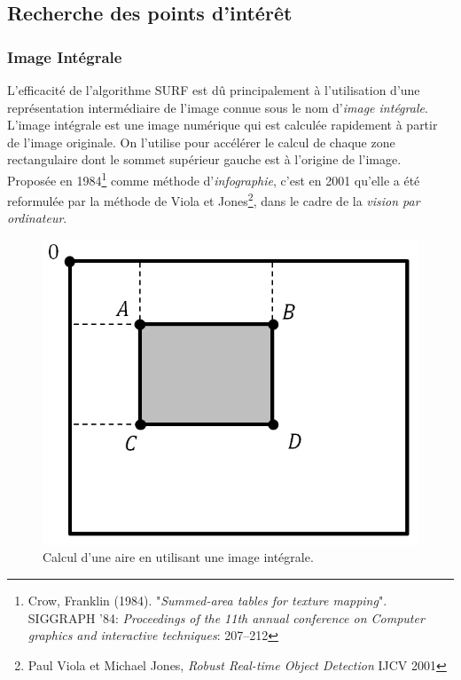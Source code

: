 \documentclass[a4paper,11pt]{report}
\begin{document}
\subsection{Recherche des points d'intérêt}
\subsubsection{Image Intégrale}
L'efficacité de l'algorithme SURF est dû principalement à l'utilisation d'une représentation intermédiaire de l'image connue sous le nom d'\textit{image intégrale}.
\\L'image intégrale est une image numérique qui est calculée rapidement à partir de l'image originale. On l'utilise pour accélérer le calcul de chaque zone rectangulaire dont le sommet supérieur gauche est à l'origine de l'image. 
\\Proposée en 1984\footnote{Crow, Franklin (1984). "\textit{Summed-area tables for texture mapping}". SIGGRAPH '84: \textit{Proceedings of the 11th annual conference on Computer graphics and interactive techniques}: 207–212} comme méthode d'\textit{infographie}, c'est en 2001 qu'elle a été reformulée par la méthode de Viola et Jones\footnote{Paul Viola et Michael Jones, \textit{Robust Real-time Object Detection} IJCV 2001}, dans le cadre de la \textit{vision par ordinateur}.
\begin{figure}[ht]
\centering
\includegraphics[scale=0.3]{figure1.png}
\caption{Calcul d'une aire en utilisant une image intégrale.}
\label{fig1}
\end{figure}
\end{document}
